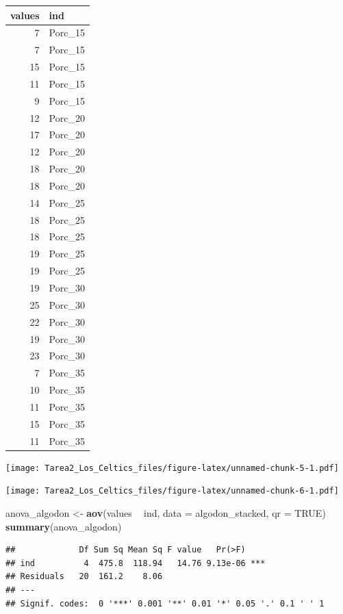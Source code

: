 \documentclass[]{article}
\newenvironment{Shaded}{\begin{snugshade}}{\end{snugshade}}
\newcommand{\KeywordTok}[1]{\textcolor[rgb]{0.13,0.29,0.53}{\textbf{#1}}}
\newcommand{\DataTypeTok}[1]{\textcolor[rgb]{0.13,0.29,0.53}{#1}}
\newcommand{\StringTok}[1]{\textcolor[rgb]{0.31,0.60,0.02}{#1}}
\newcommand{\OtherTok}[1]{\textcolor[rgb]{0.56,0.35,0.01}{#1}}
\newcommand{\OperatorTok}[1]{\textcolor[rgb]{0.81,0.36,0.00}{\textbf{#1}}}
\newcommand{\NormalTok}[1]{#1}
\begin{document}
\begin{tabular}{r|l}
\hline
values & ind\\
\hline
7 & Porc\_15\\
\hline
7 & Porc\_15\\
\hline
15 & Porc\_15\\
\hline
11 & Porc\_15\\
\hline
9 & Porc\_15\\
\hline
12 & Porc\_20\\
\hline
17 & Porc\_20\\
\hline
12 & Porc\_20\\
\hline
18 & Porc\_20\\
\hline
18 & Porc\_20\\
\hline
14 & Porc\_25\\
\hline
18 & Porc\_25\\
\hline
18 & Porc\_25\\
\hline
19 & Porc\_25\\
\hline
19 & Porc\_25\\
\hline
19 & Porc\_30\\
\hline
25 & Porc\_30\\
\hline
22 & Porc\_30\\
\hline
19 & Porc\_30\\
\hline
23 & Porc\_30\\
\hline
7 & Porc\_35\\
\hline
10 & Porc\_35\\
\hline
11 & Porc\_35\\
\hline
15 & Porc\_35\\
\hline
11 & Porc\_35\\
\hline
\end{tabular}

\texttt{[image: Tarea2\_Los\_Celtics\_files/figure-latex/unnamed-chunk-5-1.pdf]}

\texttt{[image: Tarea2\_Los\_Celtics\_files/figure-latex/unnamed-chunk-6-1.pdf]}

\begin{Shaded}
\begin{Highlighting}[]
\NormalTok{anova_algodon <-}\StringTok{ }\KeywordTok{aov}\NormalTok{(values }\OperatorTok{~}\StringTok{ }\NormalTok{ind, }\DataTypeTok{data =}\NormalTok{ algodon_stacked, }\DataTypeTok{qr =} \OtherTok{TRUE}\NormalTok{)}
\KeywordTok{summary}\NormalTok{(anova_algodon)}
\end{Highlighting}
\end{Shaded}

\begin{verbatim}
##             Df Sum Sq Mean Sq F value   Pr(>F)    
## ind          4  475.8  118.94   14.76 9.13e-06 ***
## Residuals   20  161.2    8.06                     
## ---
## Signif. codes:  0 '***' 0.001 '**' 0.01 '*' 0.05 '.' 0.1 ' ' 1
\end{verbatim}
\end{document}
